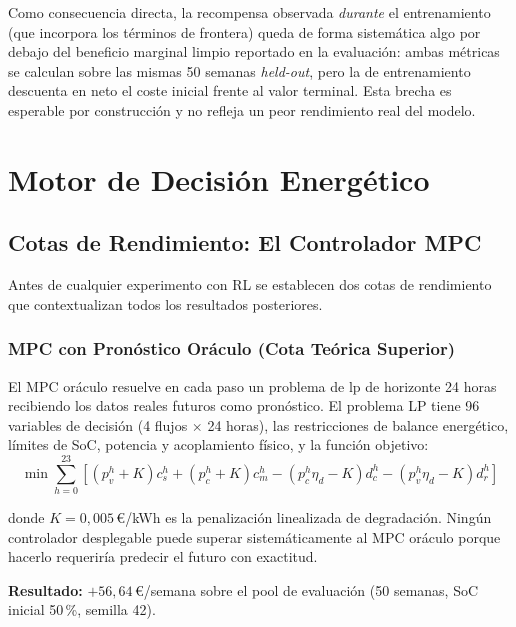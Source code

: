 \documentclass[12pt, a4paper, twoside]{report}
\begin{document}
Como consecuencia directa, la recompensa observada \emph{durante} el entrenamiento
(que incorpora los términos de frontera) queda de forma sistemática algo por debajo
del beneficio marginal limpio reportado en la evaluación: ambas métricas se calculan
sobre las mismas 50 semanas \textit{held-out}, pero la de entrenamiento descuenta en
neto el coste inicial frente al valor terminal. Esta brecha es esperable por
construcción y no refleja un peor rendimiento real del modelo.

\section{Motor de Decisión Energético}
\label{sec:motor}

\subsection{Cotas de Rendimiento: El Controlador MPC}
\label{sub:mpc}

Antes de cualquier experimento con RL se establecen dos cotas de rendimiento
que contextualizan todos los resultados posteriores.

\subsubsection{MPC con Pronóstico Oráculo (Cota Teórica Superior)}

El MPC oráculo resuelve en cada paso un problema de \acrshort{lp} de horizonte
24 horas recibiendo los datos reales futuros como pronóstico. El problema LP
tiene 96 variables de decisión (4 flujos $\times$ 24 horas), las restricciones
de balance energético, límites de SoC, potencia y acoplamiento físico, y la
función objetivo:
\begin{equation}
\min \sum_{h=0}^{23}\!\left[
  (p_v^h+K)c_s^h + (p_c^h+K)c_m^h
  - (p_c^h\eta_d-K)d_c^h - (p_v^h\eta_d-K)d_r^h
\right]
\label{eq:mpc_obj}
\end{equation}

donde $K = 0{,}005$\,€/kWh es la penalización linealizada de degradación.
Ningún controlador desplegable puede superar sistemáticamente al MPC oráculo
porque hacerlo requeriría predecir el futuro con exactitud.

\textbf{Resultado:} $+56{,}64$\,€/semana sobre el pool de
evaluación (50 semanas, SoC inicial 50\,\%, semilla 42).
\end{document}
